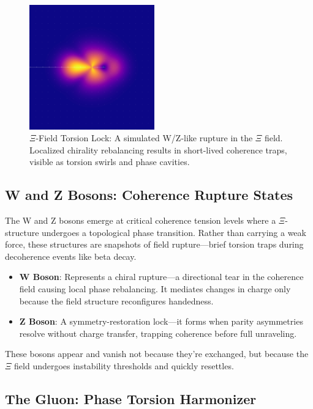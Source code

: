 \begin{figure}[ht]
\centering
\includegraphics[width=0.48\textwidth]{figures/xi_wz_rupture_overlay.png}
\caption{$\Xi$-Field Torsion Lock: A simulated W/Z-like rupture in the $\Xi$ field. Localized chirality rebalancing results in short-lived coherence traps, visible as torsion swirls and phase cavities.}
\label{fig:wz_boson_field}
\end{figure}

\subsection{W and Z Bosons: Coherence Rupture States}

The W and Z bosons emerge at critical coherence tension levels where a $\Xi$-structure undergoes a topological phase transition. Rather than carrying a weak force, these structures are snapshots of field rupture—brief torsion traps during decoherence events like beta decay.

\begin{itemize}
  \item \textbf{W Boson}: Represents a chiral rupture—a directional tear in the coherence field causing local phase rebalancing. It mediates changes in charge only because the field structure reconfigures handedness.
  \item \textbf{Z Boson}: A symmetry-restoration lock—it forms when parity asymmetries resolve without charge transfer, trapping coherence before full unraveling.
\end{itemize}

These bosons appear and vanish not because they’re exchanged, but because the $\Xi$ field undergoes instability thresholds and quickly resettles.

\subsection{The Gluon: Phase Torsion Harmonizer}

